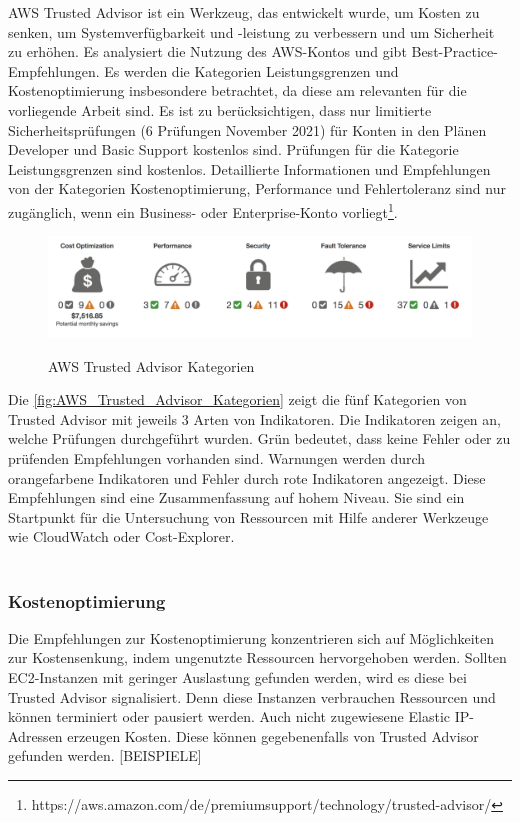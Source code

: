 AWS Trusted Advisor ist ein Werkzeug, das entwickelt wurde, um Kosten zu senken, um Systemverfügbarkeit und -leistung zu verbessern und um Sicherheit zu erhöhen. Es analysiert die Nutzung des AWS-Kontos und gibt Best-Practice-Empfehlungen. Es werden die Kategorien Leistungsgrenzen und Kostenoptimierung insbesondere betrachtet, da diese am relevanten für die vorliegende Arbeit sind. Es ist zu berücksichtigen, dass nur limitierte Sicherheitsprüfungen (6 Prüfungen November 2021) für Konten in den Plänen Developer und Basic Support kostenlos sind. Prüfungen für die Kategorie Leistungsgrenzen sind kostenlos. Detaillierte Informationen und Empfehlungen von der Kategorien Kostenoptimierung, Performance und Fehlertoleranz sind nur zugänglich, wenn ein Business- oder Enterprise-Konto vorliegt\footnote{https://aws.amazon.com/de/premiumsupport/technology/trusted-advisor/}. \\

\begin{figure}[h!]
      \centering
      \includegraphics[scale=0.4]{sources/AWS_Trusted_Advisor_Kategorien}
      \caption[AWS Trusted Advisor Kategorien]{}
      \label{fig:AWS_Trusted_Advisor_Kategorien} 
      AWS Trusted Advisor Kategorien\cite{AMZ20}
\end{figure}
Die \autoref{fig:AWS_Trusted_Advisor_Kategorien} zeigt die fünf Kategorien von Trusted Advisor mit jeweils 3 Arten von Indikatoren. Die Indikatoren zeigen an, welche Prüfungen durchgeführt wurden. Grün bedeutet, dass keine Fehler oder zu prüfenden Empfehlungen vorhanden sind. Warnungen werden durch orangefarbene Indikatoren und Fehler durch rote Indikatoren angezeigt. Diese Empfehlungen sind eine Zusammenfassung auf hohem Niveau. Sie sind ein Startpunkt für die Untersuchung von Ressourcen mit Hilfe anderer Werkzeuge wie CloudWatch oder Cost-Explorer.%
\\\\

\subsubsection*{Kostenoptimierung}
Die Empfehlungen zur Kostenoptimierung konzentrieren sich auf Möglichkeiten zur Kostensenkung, indem ungenutzte Ressourcen hervorgehoben werden. 
Sollten EC2-Instanzen mit geringer Auslastung gefunden werden, wird es diese bei Trusted Advisor signalisiert. Denn diese Instanzen verbrauchen Ressourcen und können terminiert oder pausiert werden. %
Auch nicht zugewiesene Elastic IP-Adressen erzeugen Kosten. Diese können gegebenenfalls von Trusted Advisor gefunden werden. %
[BEISPIELE]

